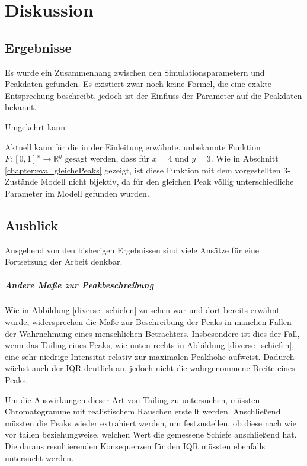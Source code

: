 \chapter{Diskussion}
\label{chapter:dis}

\section{Ergebnisse}
Es wurde ein Zusammenhang zwischen den Simulationsparametern und Peakdaten gefunden. Es existiert zwar noch keine Formel, die eine exakte Entsprechung beschreibt, jedoch ist der Einfluss der Parameter auf die Peakdaten bekannt. 

Umgekehrt kann 

Aktuell kann für die in der Einleitung erwähnte, unbekannte Funktion  $F: [0,1] ^ x \rightarrow \mathbb{R}^y$ gesagt werden, dass für $x = 4$ und $y = 3$. Wie in Abschnitt \ref{chapter:eva_gleichePeaks} gezeigt, ist diese Funktion mit dem vorgestellten 3-Zustände Modell nicht bijektiv, da für den gleichen Peak völlig unterschiedliche Parameter im Modell gefunden wurden.


\section{Ausblick}
Ausgehend von den bisherigen Ergebnissen sind viele Ansätze für eine Fortsetzung der Arbeit denkbar.

\paragraph{Andere Maße zur Peakbeschreibung}
Wie in Abbildung \ref{diverse_schiefen} zu sehen war und dort bereits erwähnt wurde, widersprechen die Maße zur Beschreibung der Peaks in manchen Fällen der Wahrnehmung eines menschlichen Betrachters. Insbesondere ist dies der Fall, wenn das Tailing eines Peaks, wie unten rechts in Abbildung \ref{diverse_schiefen}, eine sehr niedrige Intensität relativ zur maximalen Peakhöhe aufweist. Dadurch wächst auch der IQR deutlich an, jedoch nicht die wahrgenommene Breite eines Peaks.

Um die Auswirkungen dieser Art von Tailing zu untersuchen, müssten Chromatogramme mit realistischem Rauschen erstellt werden. Anschließend müssten die Peaks wieder extrahiert werden, um festzustellen, ob diese nach wie vor tailen beziehungweise, welchen Wert die gemessene Schiefe anschließend hat. Die daraus resultierenden Konsequenzen für den IQR müssten ebenfalls untersucht werden.

